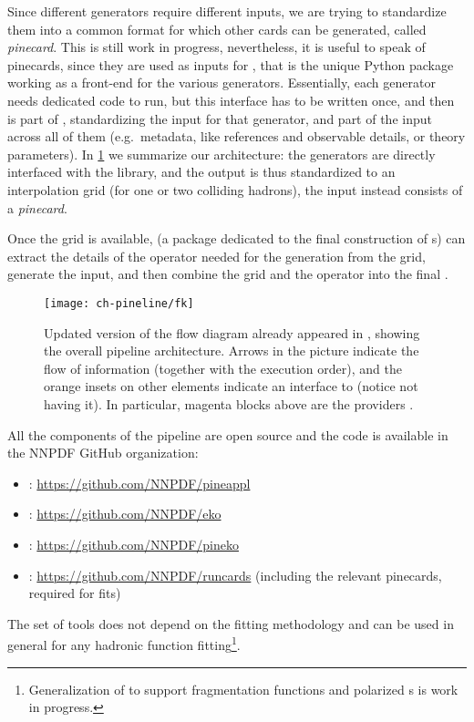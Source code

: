 Since different generators require different inputs, we are trying to
standardize them into a common format for which other cards can be generated,
called \textit{pinecard}.
This is still work in progress, nevertheless, it is useful to speak of
pinecards, since they are used as inputs for \pinefarm, that is the unique
Python package working as a front-end for the various generators.
Essentially, each generator needs dedicated code to run, but this interface has
to be written once, and then is part of \pinefarm, standardizing the input for
that generator, and part of the input across all of them (e.g.\ metadata, like
references and observable details, or theory parameters).
In \cref{fig:pine/pineline} we summarize our architecture: the generators are
directly interfaced with the \pineappl library, and the output is thus
standardized to an interpolation grid (for one or two colliding hadrons), the
input instead consists of a \textit{pinecard}.

Once the grid is available, \pineko (a package dedicated to the final
construction of \fktab{}s) can extract the details of the operator needed for
the \fktab generation from the grid, generate the \eko input, and then combine
the grid and the operator into the final \fktab.

\begin{figure}
  \centering
  \texttt{[image: ch-pineline/fk]}
  \caption{
    Updated version of the flow diagram already appeared in
    \cite{Amoroso:2022eow}, showing the overall pipeline architecture.
    Arrows in the picture indicate the flow of information (together with the
    execution order), and the orange insets on other elements indicate an
    interface to \pineappl (notice \eko not having it).
    In particular, magenta blocks above \pinefarm are the providers
    \cite{Grazzini:2017mhc,Frederix:2018nkq,Carli:2010rw,candido_alessandro_2022_6285149,Britzger:2012bs,Anastasiou:2003ds}.
  }
  \label{fig:pine/pineline}
  \vspace*{-5pt}
\end{figure}

All the components of the pipeline are open source and the code is available in
the NNPDF GitHub organization:
\begin{itemize}
  \setlength\itemsep{2pt}
  \item \pineappl: \url{https://github.com/NNPDF/pineappl}
  \item \eko: \url{https://github.com/NNPDF/eko}
  \item \pineko: \url{https://github.com/NNPDF/pineko}
  \item \pinefarm: \url{https://github.com/NNPDF/runcards} (including the
    relevant pinecards, required for \nnpdf fits)
\end{itemize}

The set of tools does not depend
on the \nnpdf fitting methodology and can be used in general for
any hadronic function fitting\footnote{
  Generalization of \pineappl to support fragmentation functions and polarized
  \pdf{}s is work in progress.
}.
